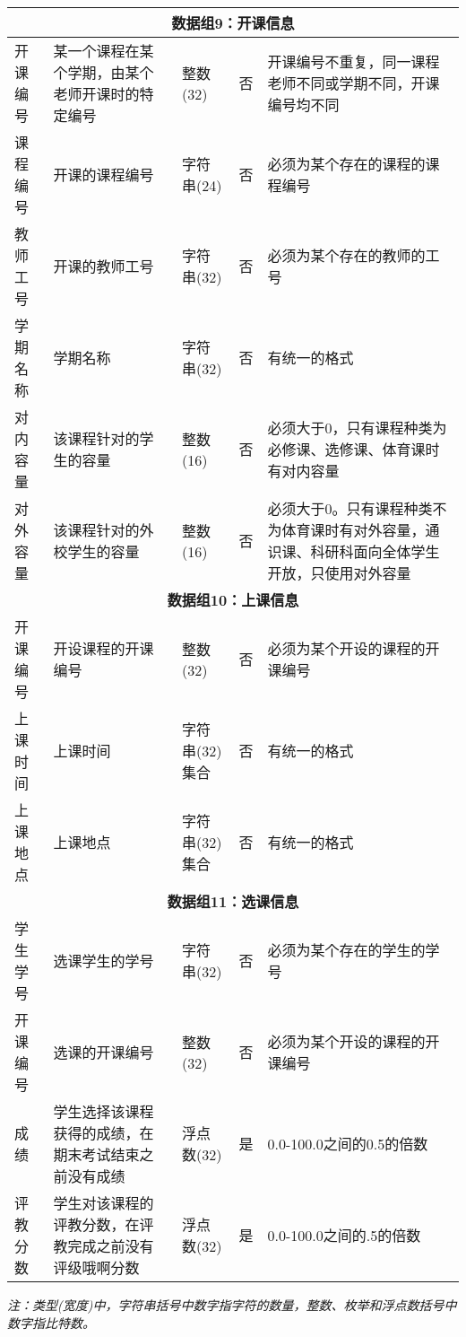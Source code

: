 \begin{center}
\begin{longtable}{p{6em}p{16em}p{8em}p{2em}p{16em}}
        \multicolumn{5}{c}{\textbf{数据组9：开课信息}} \\
        \midrule
        开课编号 & 某一个课程在某个学期，由某个老师开课时的特定编号 & 整数(32) & 否 & 开课编号不重复，同一课程老师不同或学期不同，开课编号均不同 \\
        课程编号 & 开课的课程编号 & 字符串(24) & 否 & 必须为某个存在的课程的课程编号 \\
        教师工号 & 开课的教师工号 & 字符串(32) & 否 & 必须为某个存在的教师的工号 \\
        学期名称 & 学期名称 & 字符串(32) & 否 & 有统一的格式 \\
        对内容量 & 该课程针对的学生的容量 & 整数(16) & 否 & 必须大于0，只有课程种类为必修课、选修课、体育课时有对内容量 \\
        对外容量 & 该课程针对的外校学生的容量 & 整数(16) & 否 & 必须大于0。只有课程种类不为体育课时有对外容量，通识课、科研科面向全体学生开放，只使用对外容量 \\
        \midrule

        \multicolumn{5}{c}{\textbf{数据组10：上课信息}} \\
        \midrule
        开课编号 & 开设课程的开课编号 & 整数(32) & 否 & 必须为某个开设的课程的开课编号 \\
        上课时间 & 上课时间 & 字符串(32)集合 & 否 & 有统一的格式 \\
        上课地点 & 上课地点 & 字符串(32)集合 & 否 & 有统一的格式 \\
        \midrule

        \multicolumn{5}{c}{\textbf{数据组11：选课信息}} \\
        \midrule
        学生学号 & 选课学生的学号 & 字符串(32) & 否 & 必须为某个存在的学生的学号 \\
        开课编号 & 选课的开课编号 & 整数(32) & 否 & 必须为某个开设的课程的开课编号 \\
        成绩 & 学生选择该课程获得的成绩，在期末考试结束之前没有成绩 & 浮点数(32) & 是 & 0.0-100.0之间的0.5的倍数 \\
        评教分数 & 学生对该课程的评教分数，在评教完成之前没有评级哦啊分数 & 浮点数(32) & 是 & 0.0-100.0之间的.5的倍数 \\



        
        
    \end{longtable}
    \textit{注：类型(宽度)中，字符串括号中数字指字符的数量，整数、枚举和浮点数括号中数字指比特数。}
\end{center}
